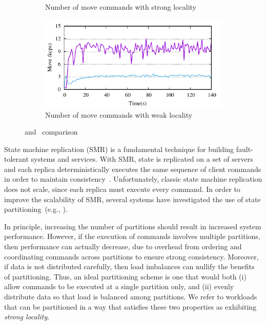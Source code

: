 \begin{figure}[ht!]
\begin{subfigure}[b]{0.45\textwidth}
  \caption{Number of move commands with strong locality}
  \end{subfigure}
  \begin{subfigure}[b]{0.45\textwidth}
    \centering
    \includegraphics[width=0.95\columnwidth]{figures/experiments/dynastar-vs-dssmr-4p-5-move}
    \caption{Number of move commands with weak locality}
  \end{subfigure}
  \caption{\dynastar and \dssmr\ comparison}
  \label{fig:motivation}
\end{figure}




State machine replication (SMR) is a fundamental technique for
building fault-tolerant systems and services. With SMR, state is
replicated on a set of servers and each replica deterministically
executes the same sequence of client commands in order to maintain
consistency~\cite{Lam78,Sch90}. Unfortunately, classic state machine replication does not
scale, since each replica must execute every command. In order to
improve the scalability of SMR, several systems have investigated the
use of state partitioning~(e.g., \cite{corbett2013spanner, bezerra2014ssmr,Glendenning:2011kj,
  Aguilera:2007,bli16edcc}).

In principle, increasing the number of partitions should result in
increased system performance. However, if the execution of commands involves
multiple partitions, then performance can
actually decrease, due to overhead from ordering and coordinating
commands across partitions to ensure strong consistency. Moreover, if
data is not distributed carefully, then load imbalances can nullify
the benefits of partitioning. Thus, an ideal partitioning scheme is
one that would both (i) allow commands to be executed at a single
partition only, and (ii) evenly distribute data so that load is
balanced among partitions.  We refer to workloads that can be
partitioned in a way that satisfies these two properties as exhibiting
\emph{strong locality}.

